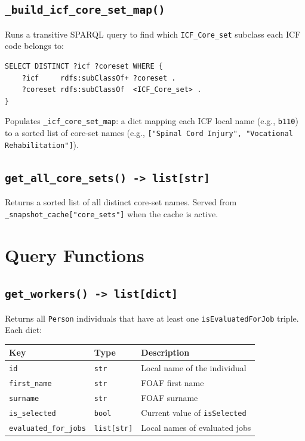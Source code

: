 ﻿\documentclass[12pt,a4paper]{article}
\begin{document}
\subsection{\texttt{\_build\_icf\_core\_set\_map()}}

Runs a transitive SPARQL query to find which \texttt{ICF\_Core\_set} subclass each ICF code belongs to:

\begin{lstlisting}[language=SPARQL]
SELECT DISTINCT ?icf ?coreset WHERE {
    ?icf     rdfs:subClassOf+ ?coreset .
    ?coreset rdfs:subClassOf  <ICF_Core_set> .
}
\end{lstlisting}

Populates \texttt{\_icf\_core\_set\_map}: a dict mapping each ICF local name (e.g., \texttt{b110}) to a sorted list of core-set names (e.g., \texttt{["Spinal Cord Injury", "Vocational Rehabilitation"]}).

\subsection{\texttt{get\_all\_core\_sets() -> list[str]}}

Returns a sorted list of all distinct core-set names. Served from \texttt{\_snapshot\_cache["core\_sets"]} when the cache is active.

\clearpage
\section{Query Functions}

\subsection{\texttt{get\_workers() -> list[dict]}}

Returns all \texttt{Person} individuals that have at least one \texttt{isEvaluatedForJob} triple. Each dict:

\begin{longtable}{@{}P{4cm}P{2.5cm}P{8cm}@{}}
\toprule
\textbf{Key} & \textbf{Type} & \textbf{Description} \\
\midrule
\endhead
\texttt{id} & \texttt{str} & Local name of the individual \\
\texttt{first\_name} & \texttt{str} & FOAF first name \\
\texttt{surname} & \texttt{str} & FOAF surname \\
\texttt{is\_selected} & \texttt{bool} & Current value of \texttt{isSelected} \\
\texttt{evaluated\_for\_jobs} & \texttt{list[str]} & Local names of evaluated jobs \\
\bottomrule
\end{longtable}
\end{document}
